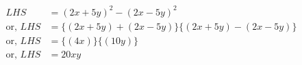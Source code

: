\documentclass{article}
\begin{document}
	\begin{align}
		LHS &= (2x+5y)^2 - (2x-5y)^2 \\
		\text{or, } LHS &= \{(2x+5y) + (2x-5y)\}\{(2x+5y) - (2x-5y)\} \\
		\text{or, } LHS &= \{(4x)\}\{(10y)\}\\
		\text{or, } LHS &= 20xy		
	\end{align}
\end{document}
